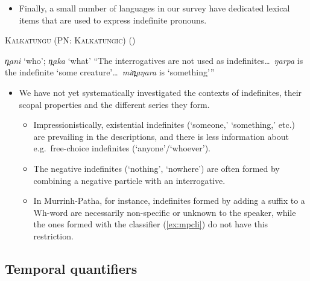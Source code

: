 \documentclass{article}
\begin{document}
\begin{itemize}
    \item Finally, a small number of languages in our survey have dedicated lexical items that are used to express indefinite pronouns.
\end{itemize}

\begin{exe}
  \ex \textsc{Kalkatungu (PN: Kalkatungic)} (\citealt[104--5]{blake79})
  \begin{xlist}
    \ex \textit{\charis n̪ani} `who'; \textit{\charis n̪aka} `what'
    \ex ``The interrogatives are not used as indefinites\ldots\ \textit{\charis ŋarpa} is the indefinite `some creature'\ldots\ \textit{\charis min̪aŋara} is `something'\thinspace''
  \end{xlist}
\end{exe}

\begin{itemize}
\item We have not yet systematically investigated the contexts of indefinites, their scopal properties and the different series they form.
  \begin{itemize}
  \item Impressionistically, existential indefinites (`someone,' `something,' etc.) are prevailing in the descriptions, and there is less information about e.g.\ free-choice indefinites (`anyone'/`whoever').
  \item The negative indefinites (`nothing', `nowhere') are often formed by combining a negative particle with an interrogative.%
  \item In Murrinh-Patha, for instance, indefinites formed by adding a suffix to a Wh-word are necessarily non-specific or unknown to the speaker, while the ones formed with the classifier (\ref{ex:mpcli}) do not have this restriction.
  \end{itemize}
  \end{itemize}


\subsection{Temporal quantifiers}
\label{sec:temporals}
\end{document}
